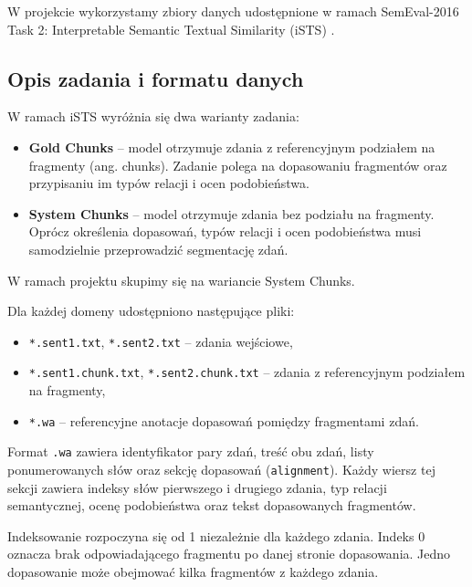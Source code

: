 \documentclass[a4paper,10pt]{article}
\begin{document}
W projekcie wykorzystamy zbiory danych udostępnione
w ramach SemEval-2016 Task 2: Interpretable Semantic
Textual Similarity (iSTS) \cite{semeval}.

\subsection{Opis zadania i formatu danych}

W ramach iSTS wyróżnia się dwa warianty zadania:

\begin{itemize}
    \item \textbf{Gold Chunks} -- model otrzymuje zdania
    z referencyjnym podziałem na fragmenty (ang. chunks).
    Zadanie polega na dopasowaniu fragmentów oraz
    przypisaniu im typów relacji i ocen podobieństwa.

    \item \textbf{System Chunks} -- model otrzymuje
    zdania bez podziału na fragmenty. Oprócz określenia
    dopasowań, typów relacji i ocen podobieństwa musi
    samodzielnie przeprowadzić segmentację zdań.
\end{itemize}

W ramach projektu skupimy się na wariancie System Chunks.

Dla każdej domeny udostępniono następujące pliki:

\begin{itemize}
    \item \texttt{*.sent1.txt}, \texttt{*.sent2.txt} --
    zdania wejściowe,

    \item \texttt{*.sent1.chunk.txt},
    \texttt{*.sent2.chunk.txt} --
    zdania z referencyjnym podziałem na fragmenty,

    \item \texttt{*.wa} -- referencyjne anotacje
    dopasowań pomiędzy fragmentami zdań.
\end{itemize}

Format \texttt{.wa} zawiera identyfikator pary zdań,
treść obu zdań, listy ponumerowanych słów oraz sekcję
dopasowań (\texttt{alignment}). Każdy wiersz tej sekcji
zawiera indeksy słów pierwszego i drugiego zdania,
typ relacji semantycznej, ocenę podobieństwa oraz
tekst dopasowanych fragmentów.

Indeksowanie rozpoczyna się od 1 niezależnie dla
każdego zdania. Indeks 0 oznacza brak odpowiadającego
fragmentu po danej stronie dopasowania. Jedno dopasowanie
może obejmować kilka fragmentów z każdego zdania.
\end{document}
